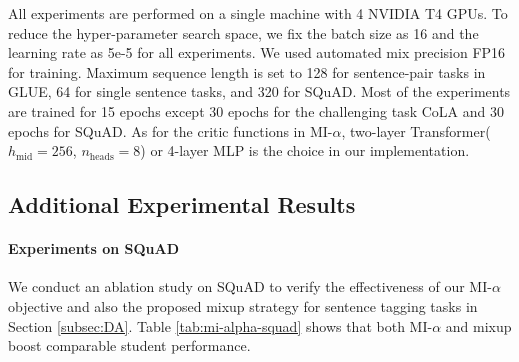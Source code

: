 \documentclass[11pt]{article}
\begin{document}
All experiments are performed on a single machine with 4 NVIDIA T4 GPUs. To reduce the hyper-parameter search space, we fix the batch size as 16 and the learning rate as 5e-5 for all experiments. We used automated mix precision FP16 for training. Maximum sequence length is set to 128 for sentence-pair tasks in GLUE, 64 for single sentence tasks, and 320 for SQuAD. Most of the experiments are trained for 15 epochs except 30 epochs for the challenging task CoLA and 30 epochs for SQuAD. As for the critic functions in MI-$\alpha$, two-layer Transformer($h_\text{mid}=256$, $n_\text{heads}=8$) or 4-layer MLP is the choice in our implementation.
\label{sec:app:com-config}

\subsection{Additional Experimental Results}
\paragraph{Experiments on SQuAD} We conduct an ablation study on SQuAD to verify the effectiveness of our MI-$\alpha$ objective and also the proposed mixup strategy for sentence tagging tasks in Section \ref{subsec:DA}. Table \ref{tab:mi-alpha-squad} shows that both MI-$\alpha$ and mixup boost comparable student performance.
\end{document}
